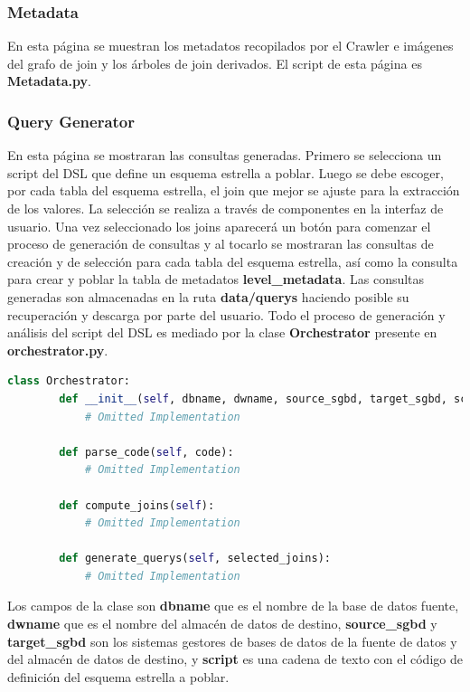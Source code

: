 \subsubsection{Metadata}

En esta página se muestran los metadatos recopilados por el Crawler e imágenes del 
grafo de join y los \'arboles de join derivados. El script de esta página es \textbf{Metadata.py}.

\subsubsection{Query Generator}

En esta página se mostraran las consultas generadas. Primero se selecciona un script del DSL que 
define un esquema estrella a poblar. Luego se debe escoger, por cada tabla del esquema estrella, el 
join que mejor se ajuste para la extracción de los valores. La selección se realiza a través 
de componentes en la interfaz de usuario. Una vez seleccionado los joins aparecer\'a un bot\'on 
para comenzar el proceso de generación de consultas y al tocarlo se mostraran las consultas 
de creación y de selección para cada tabla del esquema estrella, as\'i como la consulta 
para crear y poblar la tabla de metadatos \textbf{level\_metadata}. Las consultas generadas 
son almacenadas en la ruta \textbf{data/querys} haciendo posible su recuperación y descarga por parte del usuario. 
Todo el proceso de generación y análisis del script del DSL es mediado por la clase \textbf{Orchestrator} 
presente en \textbf{orchestrator.py}. 

\begin{lstlisting}[label={code:orchestrator}, caption={Clase Orchestrator}, language={python}]
    class Orchestrator:
        def __init__(self, dbname, dwname, source_sgbd, target_sgbd, script) -> None:
            # Omitted Implementation

        def parse_code(self, code):
            # Omitted Implementation

        def compute_joins(self):
            # Omitted Implementation

        def generate_querys(self, selected_joins):
            # Omitted Implementation
\end{lstlisting}

Los campos de la clase son \textbf{dbname} que es el nombre de la base de datos fuente, 
\textbf{dwname} que es el nombre del almacén de datos de destino, \textbf{source\_sgbd} y 
\textbf{target\_sgbd} son los sistemas gestores de bases de datos de la fuente de datos y 
del almacén de datos de destino, y \textbf{script} es una cadena de texto con el código 
de definición del esquema estrella a poblar.

